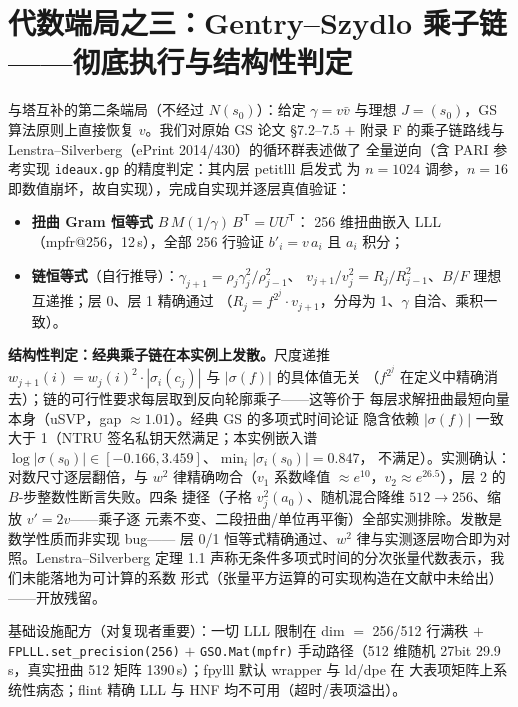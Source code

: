 \documentclass[UTF8,11pt,a4paper]{ctexart}
\newcommand{\code}[1]{\texttt{\small #1}}
\begin{document}
\section{代数端局之三：Gentry--Szydlo 乘子链——彻底执行与结构性判定}

与塔互补的第二条端局（不经过 $N(s_0)$）：给定 $\gamma = v\bar v$ 与理想
$J = (s_0)$，GS 算法原则上直接恢复 $v$。我们对原始 GS 论文 \S7.2--7.5 $+$
附录 F 的乘子链路线与 Lenstra--Silverberg（ePrint 2014/430）的循环群表述做了
全量逆向（含 PARI 参考实现 \code{ideaux.gp} 的精度判定：其内层 petitlll 启发式
为 $n = 1024$ 调参，$n = 16$ 即数值崩坏，故自实现），完成自实现并逐层真值验证：
\begin{itemize}
\item \textbf{扭曲 Gram 恒等式} $B\, M(1/\gamma)\, B^{\mathsf T} = U U^{\mathsf T}$：
  256 维扭曲嵌入 LLL（mpfr@256，12\,s），全部 256 行验证 $b'_i = v\, a_i$ 且
  $a_i$ 积分；
\item \textbf{链恒等式}（自行推导）：$\gamma_{j+1} = \rho_j \gamma_j^2 / \rho_{j-1}^2$、
  $v_{j+1}/v_j^2 = R_j / R_{j-1}^2$、$B/F$ 理想互递推；层 0、层 1 精确通过
  （$R_j = f^{2^j}\cdot v_{j+1}$，分母为 1、$\gamma$ 自洽、乘积一致）。
\end{itemize}

\textbf{结构性判定：经典乘子链在本实例上发散。}尺度递推
$w_{j+1}(i) = w_j(i)^2\cdot|\sigma_i(c_j)|$ 与 $|\sigma(f)|$ 的具体值无关
（$f^{2^j}$ 在定义中精确消去）；链的可行性要求每层取到反向轮廓乘子——这等价于
每层求解扭曲最短向量本身（uSVP，gap $\approx 1.01$）。经典 GS 的多项式时间论证
隐含依赖 $|\sigma(f)|$ 一致大于 1（NTRU 签名私钥天然满足；本实例嵌入谱
$\log|\sigma(s_0)| \in [-0.166, 3.459]$、$\min_i |\sigma_i(s_0)| = 0.847$，
不满足）。实测确认：对数尺寸逐层翻倍，与 $w^2$ 律精确吻合（$v_1$ 系数峰值
$\approx e^{10}$，$v_2 \approx e^{26.5}$），层 2 的 $B$-步整数性断言失败。四条
捷径（子格 $v_j^2(a_0)$、随机混合降维 $512 \to 256$、缩放 $v' = 2v$——乘子逐
元素不变、二段扭曲/单位再平衡）全部实测排除。发散是数学性质而非实现 bug——
层 0/1 恒等式精确通过、$w^2$ 律与实测逐层吻合即为对照。Lenstra--Silverberg
定理 1.1 声称无条件多项式时间的分次张量代数表示，我们未能落地为可计算的系数
形式（张量平方运算的可实现构造在文献中未给出）——开放残留。

基础设施配方（对复现者重要）：一切 LLL 限制在 dim $=$ 256/512 行满秩 $+$
\code{FPLLL.set\_precision(256)} $+$ \code{GSO.Mat(mpfr)} 手动路径（512 维随机
27bit 29.9\,s，真实扭曲 512 矩阵 1390\,s）；fpylll 默认 wrapper 与 ld/dpe 在
大表项矩阵上系统性病态；flint 精确 LLL 与 HNF 均不可用（超时/表项溢出）。
\end{document}
